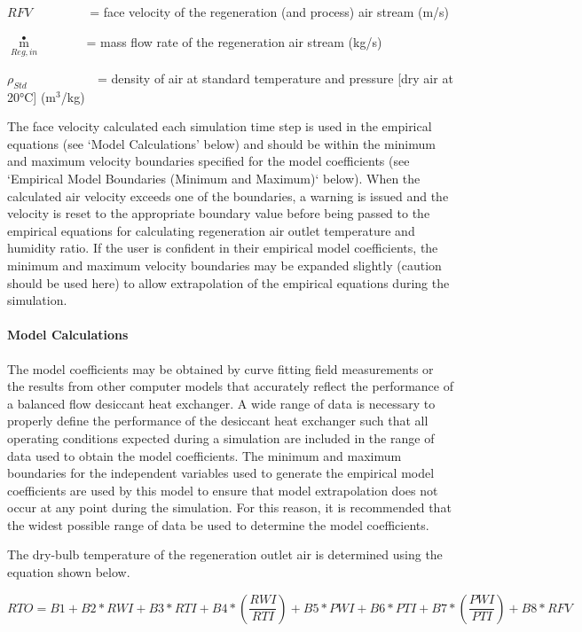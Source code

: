 \(RFV\) ~~~~~~~~ = face velocity of the regeneration (and process) air stream (m/s)

\({\mathop m\limits^ \bullet_{Reg,in}}\) ~~~~~~ = mass flow rate of the regeneration air stream (kg/s)

\({\rho_{Std}}\) ~~~~~~~~~~ = density of air at standard temperature and pressure {[}dry air at 20°C{]} (m\(^{3}\)/kg)

The face velocity calculated each simulation time step is used in the empirical equations (see `Model Calculations' below) and should be within the minimum and maximum velocity boundaries specified for the model coefficients (see `Empirical Model Boundaries (Minimum and Maximum)` below). When the calculated air velocity exceeds one of the boundaries, a warning is issued and the velocity is reset to the appropriate boundary value before being passed to the empirical equations for calculating regeneration air outlet temperature and humidity ratio. If the user is confident in their empirical model coefficients, the minimum and maximum velocity boundaries may be expanded slightly (caution should be used here) to allow extrapolation of the empirical equations during the simulation.

\paragraph{Model Calculations}\label{model-calculations}

The model coefficients may be obtained by curve fitting field measurements or the results from other computer models that accurately reflect the performance of a balanced flow desiccant heat exchanger. A wide range of data is necessary to properly define the performance of the desiccant heat exchanger such that all operating conditions expected during a simulation are included in the range of data used to obtain the model coefficients. The minimum and maximum boundaries for the independent variables used to generate the empirical model coefficients are used by this model to ensure that model extrapolation does not occur at any point during the simulation. For this reason, it is recommended that the widest possible range of data be used to determine the model coefficients.

The dry-bulb temperature of the regeneration outlet air is determined using the equation shown below.

\begin{equation}
RTO = B1 + B2*RWI + B3*RTI + B4*\left( {\frac{{RWI}}{{RTI}}} \right) + B5*PWI + B6*PTI + B7*\left( {\frac{{PWI}}{{PTI}}} \right) + B8*RFV
\end{equation}

